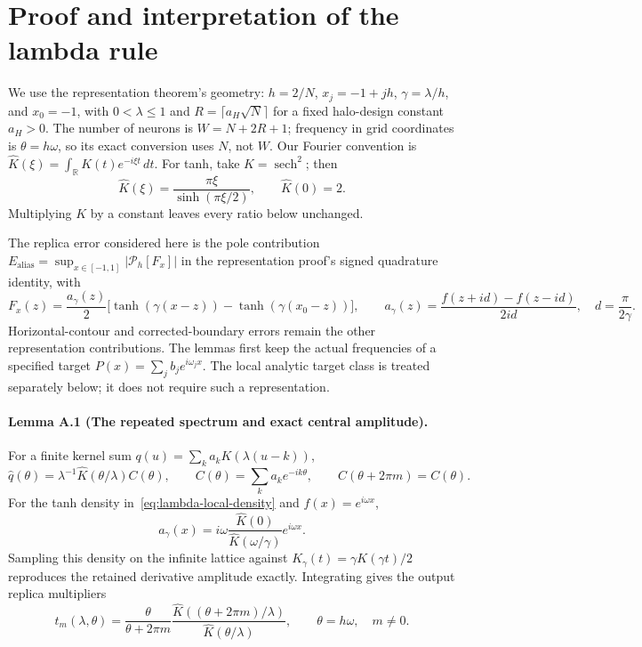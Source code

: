 \section{Proof and interpretation of the lambda rule}
\label{app:lambda}

We use the representation theorem's geometry: $h=2/N$, $x_j=-1+jh$,
$\gamma=\lambda/h$, and $x_0=-1$, with $0<\lambda\le1$ and
$R=\lceil a_H\sqrt N\rceil$ for a fixed halo-design constant $a_H>0$.
The number of neurons is
$W=N+2R+1$; frequency in grid coordinates is $\theta=h\omega$, so its exact
conversion uses $N$, not $W$. Our Fourier convention is
$\widehat K(\xi)=\int_{\mathbb R}K(t)e^{-i\xi t}\,dt$.
For tanh, take $K=\operatorname{sech}^2$; then
\begin{equation}
 \widehat K(\xi)=\frac{\pi\xi}{\sinh(\pi\xi/2)},\qquad \widehat K(0)=2.
 \label{eq:lambda-tanh-transform}
\end{equation}
Multiplying $K$ by a constant leaves every ratio below unchanged.

The replica error considered here is the pole contribution
$E_{\mathrm{alias}}=\sup_{x\in[-1,1]}|\mathcal P_h[F_x]|$ in the
representation proof's signed quadrature identity, with
\begin{equation}
 F_x(z)=\frac{a_\gamma(z)}2
 \bigl[\tanh(\gamma(x-z))-\tanh(\gamma(x_0-z))\bigr],\qquad
 a_\gamma(z)=\frac{f(z+id)-f(z-id)}{2id},\quad d=\frac\pi{2\gamma}.
 \label{eq:lambda-local-density}
\end{equation}
Horizontal-contour and corrected-boundary errors remain the other
representation contributions. The lemmas first keep the actual frequencies
of a specified target $P(x)=\sum_jb_je^{i\omega_jx}$. The local analytic
target class is treated separately below; it does not require such a
representation.

\paragraph{Lemma A.1 (The repeated spectrum and exact central amplitude).}
For a finite kernel sum $q(u)=\sum_ka_kK(\lambda(u-k))$,
\begin{equation}
 \widehat q(\theta)=\lambda^{-1}\widehat K(\theta/\lambda)C(\theta),
 \qquad C(\theta)=\sum_ka_ke^{-ik\theta},\qquad
 C(\theta+2\pi m)=C(\theta).
 \label{eq:lambda-periodic-factor}
\end{equation}
For the tanh density in~\eqref{eq:lambda-local-density} and
$f(x)=e^{i\omega x}$,
\begin{equation}
 a_\gamma(x)=i\omega\frac{\widehat K(0)}{\widehat K(\omega/\gamma)}e^{i\omega x}.
 \label{eq:lambda-exact-deconvolution}
\end{equation}
Sampling this density on the infinite lattice against
$K_\gamma(t)=\gamma K(\gamma t)/2$ reproduces the retained derivative
amplitude exactly. Integrating gives the output replica multipliers
\begin{equation}
 t_m(\lambda,\theta)=
 \frac{\theta}{\theta+2\pi m}
 \frac{\widehat K((\theta+2\pi m)/\lambda)}{\widehat K(\theta/\lambda)},
 \qquad \theta=h\omega,\quad m\ne0.
 \label{eq:lambda-output-multiplier}
\end{equation}

